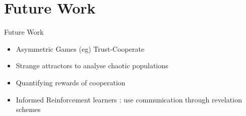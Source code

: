 \documentclass{IFES-beamer}
\begin{document}
\section{Future Work}
    \begin{frame}{Future Work}
        \begin{itemize}
            \item Asymmetric Games (eg) Trust-Cooperate
            \item Strange attractors to analyse chaotic populations
            \item Quantifying rewards of cooperation
            \item  Informed Reinforcement learners : use communication through revelation schemes
        \end{itemize}
    \end{frame}

\end{document}

